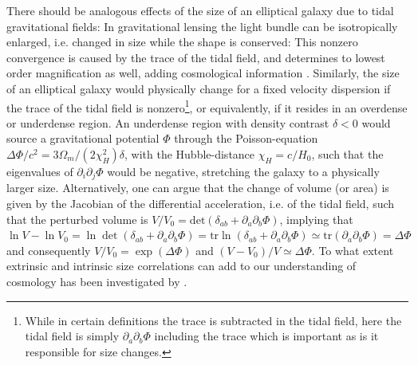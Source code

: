 \documentclass[a4paper,fleqn,usenatbib]{mnras}
\begin{document}
There should be analogous effects of the size of an elliptical galaxy due to tidal gravitational fields: In gravitational lensing the light bundle can be isotropically enlarged, i.e. changed in size while the shape is conserved: This nonzero convergence is caused by the trace of the tidal field, and determines to lowest order magnification as well, adding cosmological information \cite{huff_magnificent_2011, takahashi_probability_2011}. Similarly, the size of an elliptical galaxy would physically change for a fixed velocity dispersion if the trace of the tidal field is nonzero\footnote{While in certain definitions the trace is subtracted in the tidal field, here the tidal field is simply $\partial_a\partial_b\Phi$ including the trace which is important as is it responsible for size changes.}, or equivalently, if it resides in an overdense or underdense region. An underdense region with density contrast $\delta < 0$ would source a gravitational potential $\Phi$ through the Poisson-equation $\Delta\Phi/c^2 = 3\Omega_m/(2\chi_H^2)\delta$, with the Hubble-distance $\chi_H = c/H_0$, such that the eigenvalues of $\partial_i\partial_j\Phi$ would be negative, stretching the galaxy to a physically larger size. Alternatively, one can argue that the change of volume (or area) is given by the Jacobian of the differential acceleration, i.e. of the tidal field, such that the perturbed volume is $V/V_0 = \mathrm{det}(\delta_{ab} + \partial_a\partial_b\Phi)$, implying that $\ln V-\ln V_0 = \ln\det(\delta_{ab} + \partial_a\partial_b\Phi) = \mathrm{tr}\ln(\delta_{ab} + \partial_a\partial_b\Phi) \simeq \mathrm{tr}(\partial_a\partial_b\Phi) = \Delta\Phi$ and consequently $V/V_0 = \exp(\Delta\Phi)$ and $(V-V_0)/V \simeq\Delta\Phi$. To what extent extrinsic and intrinsic size correlations can add to our understanding of cosmology has been investigated by \citet{heavens_combining_2013}.
\end{document}
